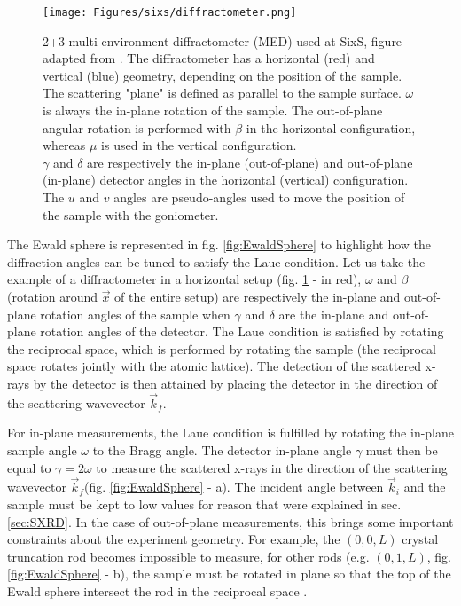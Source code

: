 \begin{figure}[!htb]
    \centering
    \texttt{[image: Figures/sixs/diffractometer.png]}
    \caption{
    2+3 multi-environment diffractometer (MED) used at SixS, figure adapted from \cite{Schleputz2011}.
    The diffractometer has a horizontal (red) and vertical (blue) geometry, depending on the position of the sample.\\
    The scattering "plane" is defined as parallel to the sample surface.
    $\omega$ is always the in-plane rotation of the sample.
    The out-of-plane angular rotation is performed with $\beta$ in the horizontal configuration, whereas $\mu$ is used in the vertical configuration.\\
    $\gamma$ and $\delta$ are respectively the in-plane (out-of-plane) and out-of-plane (in-plane) detector angles in the horizontal (vertical) configuration.\\
    The $u$ and $v$ angles are pseudo-angles used to move the position of the sample with the goniometer.
    }
    \label{fig:Diffractometer}
\end{figure}

The Ewald sphere is represented in fig. \ref{fig:EwaldSphere} to highlight how the diffraction angles can be tuned to satisfy the Laue condition.
Let us take the example of a diffractometer in a horizontal setup (fig. \ref{fig:Diffractometer} - in red), $\omega$ and $\beta$ (rotation around $\vec{x}$ of the entire setup) are respectively the in-plane and out-of-plane rotation angles of the sample when $\gamma$ and $\delta$ are the in-plane and out-of-plane rotation angles of the detector.
The Laue condition is satisfied by rotating the reciprocal space, which is performed by rotating the sample (the reciprocal space rotates jointly with the atomic lattice).
The detection of the scattered x-rays by the detector is then attained by placing the detector in the direction of the scattering wavevector $\vec{k}_f$.

For in-plane measurements, the Laue condition is fulfilled by rotating the in-plane sample angle $\omega$ to the Bragg angle.
The detector in-plane angle $\gamma$ must then be equal to $\gamma = 2 \omega$ to measure the scattered x-rays in the direction of the scattering wavevector $\vec{k}_f$(fig. \ref{fig:EwaldSphere} - a).
The incident angle between $\vec{k}_i$ and the sample must be kept to low values for reason that were explained in sec. \ref{sec:SXRD}.
In the case of out-of-plane measurements, this brings some important constraints about the experiment geometry.
For example, the $(0, 0, L)$ crystal truncation rod becomes impossible to measure, for other rods (e.g. $(0, 1, L)$, fig. \ref{fig:EwaldSphere} - b), the sample must be rotated in plane so that the top of the Ewald sphere intersect the rod in the reciprocal space \parencite{Vlieg1997, Schlepütz2005}.


